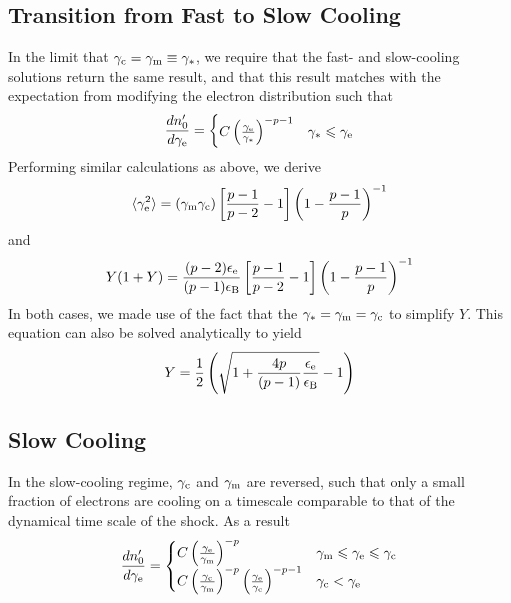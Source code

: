 \documentclass[fleqn,usenatbib]{mnras}
\begin{document}
\subsection{Transition from Fast to Slow Cooling}

In the limit that $\gamma_{\rm c} = \gamma_{\rm m}\equiv\gamma_*$, we require that the fast- and slow-cooling solutions return the same result, and that this result matches with the expectation from modifying the electron distribution such that
\begin{equation}
\frac{dn_0^{\prime}}{d\gamma_{\rm e}}= \begin{cases} 
      C\left(\frac{\gamma_{\rm e}}{\gamma_*}\right)^{-p-1} & \gamma_* \leq \gamma_{\rm e} \\
  \end{cases}
\end{equation}
Performing similar calculations as above, we derive
\begin{equation}
\langle \gamma_{\rm e}^2 \rangle = (\gamma_{\rm m}\gamma_{\rm c})\left[\frac{p-1}{p-2}-1\right]\left(1-\frac{p-1}{p}\right)^{-1}
\end{equation}
and
\begin{equation}
Y(1+Y)=\frac{(p-2)\epsilon_{\rm e}}{(p-1)\epsilon_{\rm B}}\left[\frac{p-1}{p-2}-1\right]\left(1-\frac{p-1}{p}\right)^{-1}
\end{equation}
In both cases, we made use of the fact that the $\gamma_*=\gamma_{\rm m}=\gamma_{\rm c}$ to simplify $Y$.  This equation can also be solved analytically to yield
\begin{equation}
Y =\frac{1}{2}\left(\sqrt{1+\frac{4p}{(p-1)}\frac{\epsilon_{\rm e}}{\epsilon_{\rm B}}}-1\right)
\end{equation}
\subsection{Slow Cooling}

In the slow-cooling regime, $\gamma_{\rm c}$ and $\gamma_{\rm m}$ are reversed, such that only a small fraction of electrons are cooling on a timescale comparable to that of the dynamical time scale of the shock. As a result
\begin{equation}
\label{ne:slow}
\frac{dn_0^{\prime}}{d\gamma_{\rm e}}= \begin{cases} 
      C\left(\frac{\gamma_{\rm e}}{\gamma_{\rm m}}\right)^{-p} & \gamma_{\rm m} \leq \gamma_{\rm e}\leq\gamma_{\rm c} \\
     C\left(\frac{\gamma_{\rm c}}{\gamma_{\rm m}}\right)^{-p}\left(\frac{\gamma_{\rm e}}{\gamma_{\rm c}}\right)^{-p-1} & \gamma_{\rm c} < \gamma_{\rm e}\\
   \end{cases}
\end{equation}
\end{document}
